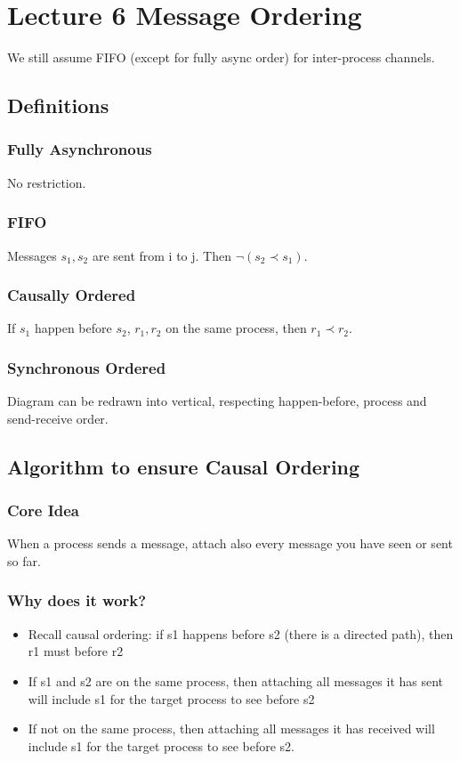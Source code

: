 \documentclass[11pt]{article}
\begin{document}
\section{Lecture 6 Message Ordering}
\label{sec:org8d1d9f7}
We still assume FIFO (except for fully async order) for inter-process channels.
\subsection{Definitions}
\label{sec:org7ce1ebf}
\subsubsection{Fully Asynchronous}
\label{sec:org1ca21bd}
No restriction.
\subsubsection{FIFO}
\label{sec:org0baa245}
Messages \(s_1,s_2\) are sent from i to j. Then \(\neg(s_2\prec s_1)\).
\subsubsection{Causally Ordered}
\label{sec:org20a9c79}
If \(s_1\) happen before \(s_2\), \(r_1, r_2\) on the same process, then \(r_1\prec
r_2\).
\subsubsection{Synchronous Ordered}
\label{sec:org87de76a}
Diagram can be redrawn into vertical, respecting happen-before, process and
send-receive order.
\subsection{Algorithm to ensure Causal Ordering}
\label{sec:orgf896f74}
\subsubsection{Core Idea}
\label{sec:org8ed3d63}
When a process sends a message, attach also every message you have seen or sent
so far.
\subsubsection{Why does it work?}
\label{sec:org0453d7c}
\begin{itemize}
  \item Recall causal ordering: if s1 happens before s2 (there is a directed path),
        then r1 must before r2
  \item If s1 and s2 are on the same process, then attaching all messages it has sent
        will include s1 for the target process to see before s2
  \item If not on the same process, then attaching all messages it has received will
        include s1 for the target process to see before s2.
\end{itemize}
\end{document}
